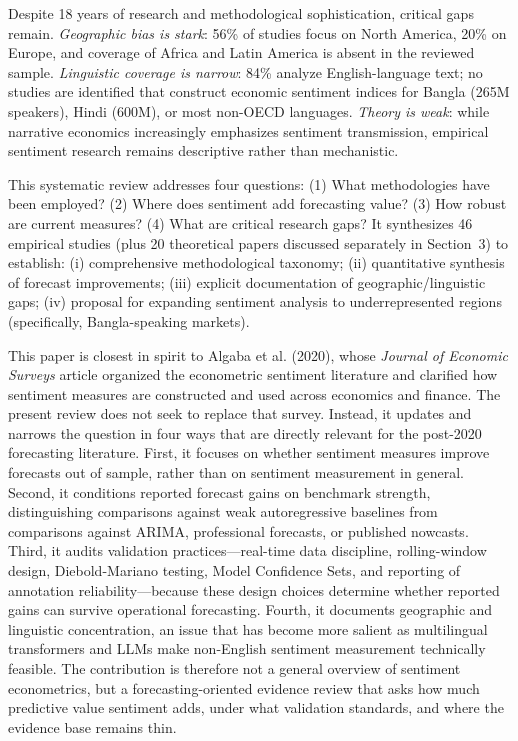 \documentclass[11pt,twocolumn]{article}
\begin{document}
Despite 18 years of research and methodological sophistication, critical gaps remain. \textit{Geographic bias is stark}: 56\% of studies focus on North America, 20\% on Europe, and coverage of Africa and Latin America is absent in the reviewed sample. \textit{Linguistic coverage is narrow}: 84\% analyze English-language text; no studies are identified that construct economic sentiment indices for Bangla (265M speakers), Hindi (600M), or most non-OECD languages. \textit{Theory is weak}: while narrative economics increasingly emphasizes sentiment transmission, empirical sentiment research remains descriptive rather than mechanistic.

This systematic review addresses four questions: (1) What methodologies have been employed? (2) Where does sentiment add forecasting value? (3) How robust are current measures? (4) What are critical research gaps? It synthesizes 46 empirical studies (plus 20 theoretical papers discussed separately in Section~3) to establish: (i) comprehensive methodological taxonomy; (ii) quantitative synthesis of forecast improvements; (iii) explicit documentation of geographic/linguistic gaps; (iv) proposal for expanding sentiment analysis to underrepresented regions (specifically, Bangla-speaking markets).

This paper is closest in spirit to Algaba et al. (2020), whose \textit{Journal of Economic Surveys} article organized the econometric sentiment literature and clarified how sentiment measures are constructed and used across economics and finance. The present review does not seek to replace that survey. Instead, it updates and narrows the question in four ways that are directly relevant for the post-2020 forecasting literature. First, it focuses on whether sentiment measures improve forecasts out of sample, rather than on sentiment measurement in general. Second, it conditions reported forecast gains on benchmark strength, distinguishing comparisons against weak autoregressive baselines from comparisons against ARIMA, professional forecasts, or published nowcasts. Third, it audits validation practices---real-time data discipline, rolling-window design, Diebold-Mariano testing, Model Confidence Sets, and reporting of annotation reliability---because these design choices determine whether reported gains can survive operational forecasting. Fourth, it documents geographic and linguistic concentration, an issue that has become more salient as multilingual transformers and LLMs make non-English sentiment measurement technically feasible. The contribution is therefore not a general overview of sentiment econometrics, but a forecasting-oriented evidence review that asks how much predictive value sentiment adds, under what validation standards, and where the evidence base remains thin.
\end{document}
